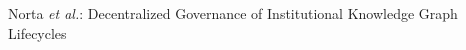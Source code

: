 \documentclass[journal]{IEEEtran}
\begin{document}
%
{Norta \MakeLowercase{\textit{et al.}}: Decentralized Governance of Institutional Knowledge Graph Lifecycles}
% 












\maketitle
\end{document}
